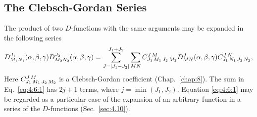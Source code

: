 \subsection{The Clebsch-Gordan Series}\label{sec:4.6.1}
The product of two $D$-functions with the same arguments may be expanded in the following series
\begin{equation}
D_{M_{1} N_{1}}^{J_{1}}(\alpha, \beta, \gamma) D_{M_{2} N_{2}}^{J_{2}}(\alpha, \beta, \gamma)=\sum_{J=\left|J_{1}-J_{2}\right|}^{J_{1}+J_{2}} \sum_{M N} C_{J_{1}\,M_{1}\,J_{2}\,M_{2}}^{J\,M} D_{M N}^{J}(\alpha, \beta, \gamma) C_{J_{1}\,N_{1}\,J_{2}\,N_{2}}^{J\,N}, \label{eq:4:6:1}
\end{equation}
Here $C_{J_{1}\,M_{1}\,J_{2}\,M_{2}}^{J\,M}$ is a Clebsch-Gordan coefficient (Chap.~\ref{chap:8}). The sum in Eq.~\eqref{eq:4:6:1} has $2 j+1$ terms, where $j=\min \left(J_{1}, J_{2}\right)$. Equation \eqref{eq:4:6:1} may be regarded as a particular case of the expansion of an arbitrary function in a series of the $D$-functions (Sec.~\ref{sec:4.10}).

